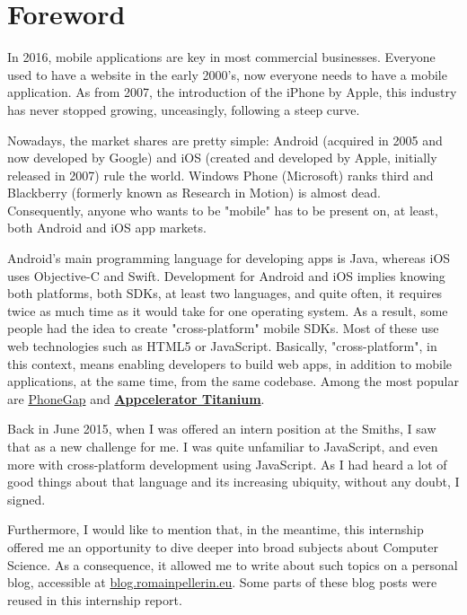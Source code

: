 \chapter*{Foreword}

In 2016, mobile applications are key in most commercial businesses. Everyone used to have a website in the early 2000's, now everyone needs to have a mobile application. As from 2007, the introduction of the iPhone by Apple, this industry has never stopped growing, unceasingly, following a steep curve.

\medskip

Nowadays, the market shares are pretty simple: Android (acquired in 2005 and now developed by Google) and iOS (created and developed by Apple, initially released in 2007) rule the world. Windows Phone (Microsoft) ranks third and Blackberry (formerly known as Research in Motion) is almost dead. Consequently, anyone who wants to be "mobile" has to be present on, at least, both Android and iOS app markets.

\medskip

Android's main programming language for developing apps is Java, whereas iOS uses Objective-C and Swift. Development for Android and iOS implies knowing both platforms, both SDKs, at least two languages, and quite often, it requires twice as much time as it would take for one operating system. As a result, some people had the idea to create "cross-platform" mobile SDKs. Most of these use web technologies such as HTML5 or JavaScript. Basically, "cross-platform", in this context, means enabling developers to build web apps, in addition to mobile applications, at the same time, from the same codebase. Among the most popular are \href{http://phonegap.com/}{PhoneGap} and \textbf{\href{http://www.appcelerator.com/}{Appcelerator Titanium}}.

\medskip

Back in June 2015, when I was offered an intern position at the Smiths, I saw that as a new challenge for me. I was quite unfamiliar to JavaScript, and even more with cross-platform development using JavaScript. As I had heard a lot of good things about that language and its increasing ubiquity, without any doubt, I signed.

\bigskip

\begin{itshape}
Furthermore, I would like to mention that, in the meantime, this internship offered me an opportunity to dive deeper into broad subjects about Computer Science. As a consequence, it allowed me to write about such topics on a personal blog, accessible at \href{http://blog.romainpellerin.eu/}{blog.romainpellerin.eu}. Some parts of these blog posts were reused in this internship report.
\end{itshape}

